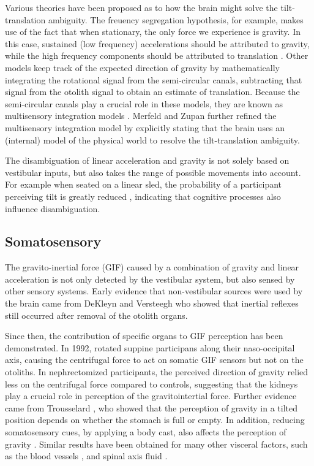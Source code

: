 Various theories have been proposed as to how the brain might solve the tilt-translation ambiguity. The freuency segregation hypothesis, for example, makes use of the fact that when stationary, the only force we experience is gravity. In this case, sustained (low frequency) accelerations should be  attributed to gravity, while the high frequency components should be attributed to translation \cite{paige1991, telford1997}. Other models keep track of the expected direction of gravity by mathematically integrating the rotational signal from the semi-circular canals, subtracting that signal from the otolith signal to obtain an estimate of translation. Because the semi-circular canals play a  crucial role in these models, they are known as multisensory integration models \cite{mayne1974,ormsby1977}. Merfeld and Zupan \citeyear{merfeld1995,merfeld2002} further refined the multisensory integration model by explicitly stating that the brain uses an (internal) model of the physical world to resolve the tilt-translation ambiguity.

The disambiguation of linear acceleration and gravity is not solely based on vestibular inputs, but also takes the  range of  possible movements into account. For example when seated on a linear sled, the probability of a participant perceiving tilt is greatly reduced \cite{wertheim2001}, indicating that cognitive processes also influence disambiguation.


\subsection{Somatosensory}
The gravito-inertial force (GIF) caused by a combination of gravity and linear acceleration is not only detected by the vestibular system, but also sensed by other sensory systems. Early evidence that non-vestibular sources were used by the brain came from DeKleyn and Versteegh \citeyear{dekleyn1933} who showed that inertial reflexes still occurred after removal of the otolith organs.

Since then, the contribution of specific organs to GIF perception has been demonstrated. In 1992, \citeauthor{mittelstaedt1992} rotated suppine participans along  their naso-occipital axis,  causing  the centrifugal force to act on somatic GIF sensors  but not on the otoliths. In nephrectomized participants, the perceived direction of gravity relied less on the centrifugal force compared to controls, suggesting that the kidneys play a crucial role in perception of the gravitointertial force. Further evidence came from Trousselard \citeyear{trousselard2004}, who showed that the perception of gravity in a tilted position depends on whether the stomach is full or empty. In addition, reducing somatosensory cues, by applying a body cast, also affects the perception of gravity \cite{trousselard2004}.  Similar results have been obtained for many other visceral factors, such as the blood vessels \cite{vaitl2002}, and spinal axis fluid \cite{vaitl1997}.


